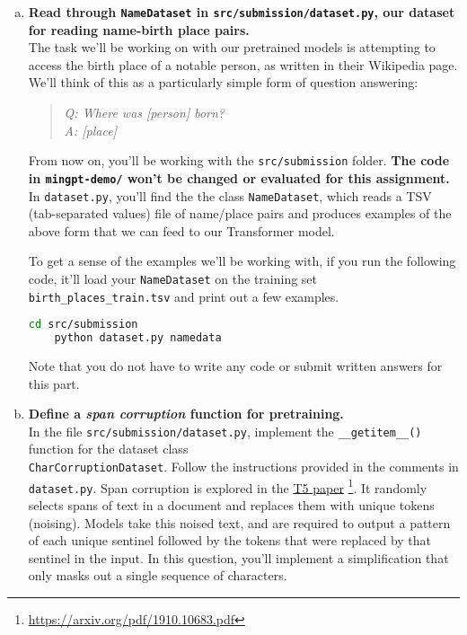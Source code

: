 \begin{enumerate}[(a)]
\item {} \textbf{Read through \texttt{NameDataset} in \texttt{src/submission/dataset.py}, our dataset for reading name-birth place pairs.}\\
The task we'll be working on with our pretrained models is attempting to access the birth place of a notable person, as written in their Wikipedia page.
We'll think of this as a particularly simple form of question answering:
\begin{quote}
    \textit{Q: Where was \textit{[person]} born?}\\
    \textit{A: [place]}
\end{quote}
From now on, you'll be working with the \texttt{src/submission} folder. \textbf{The code in \texttt{mingpt-demo/} won't be changed or evaluated for this assignment.}
In \texttt{dataset.py}, 
you'll find the the class \texttt{NameDataset}, which reads a TSV (tab-separated values) file of name/place pairs and produces examples of the above form that we can feed to our Transformer model.

To get a sense of the examples we'll be working with, if you run the following code, it'll load your \texttt{NameDataset} on the training set \texttt{birth\_places\_train.tsv} and print out a few examples.
\begin{lstlisting}[language=bash]
    cd src/submission
    python dataset.py namedata 
\end{lstlisting}

Note that you do not have to write any code or submit written answers for this part.

\item {} \textbf{Define a \textit{span corruption} function for pretraining.}\\
In the file \texttt{src/submission/dataset.py}, implement the \texttt{\_\_getitem\_\_()} function for the dataset class \\
\texttt{CharCorruptionDataset}.
Follow the instructions provided in the comments in \texttt{dataset.py}.
Span corruption is explored in the \href{https://arxiv.org/pdf/1910.10683.pdf}{T5 paper} \footnote{\url{https://arxiv.org/pdf/1910.10683.pdf}}.
It randomly selects spans of text in a document and replaces them with unique tokens (noising).
Models take this noised text, and are required to output a pattern of each unique sentinel followed by the tokens that were replaced by that sentinel in the input.
In this question, you'll implement a simplification that only masks out a single sequence of characters.


\end{enumerate}
